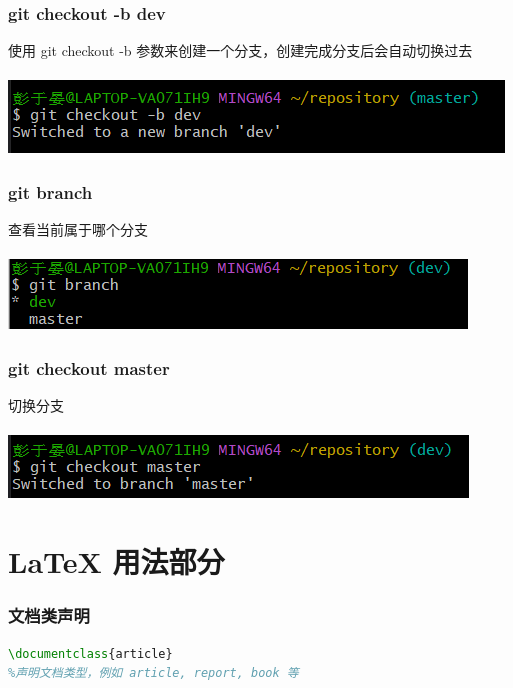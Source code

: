 \documentclass[a4paper, 12pt]{article}
\begin{document}
\section{git checkout -b dev}
使用 git checkout -b 参数来创建一个分支，创建完成分支后会自动切换过去\\ \\
\includegraphics[width=1\linewidth]{10.png}

\section{git branch}
查看当前属于哪个分支\\ \\
\includegraphics[width=1\linewidth]{11.png}

\section{git checkout master}
切换分支\\ \\
\includegraphics[width=1\linewidth]{12.png}

\part{LaTeX 用法部分}

\section{文档类声明}
\begin{lstlisting}[language=TeX]
\documentclass{article}  
%声明文档类型，例如 article, report, book 等
\end{lstlisting}
\end{document}
